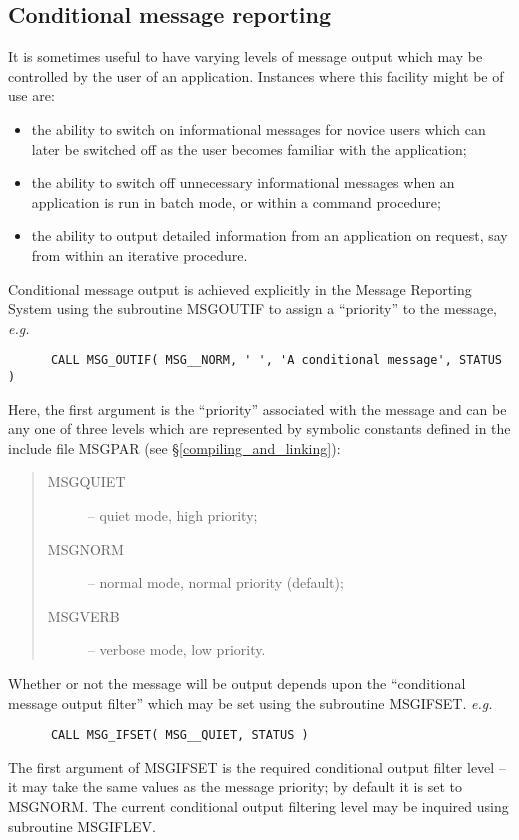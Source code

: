\documentclass[twoside,11pt]{article}
\newcommand{\htmlref}[2]{#1}
\newcommand{\latex}[1]{#1}
\newcommand{\xlabel}[1]{}
\renewcommand{\_}{\texttt{\symbol{95}}}
\begin{document}
\subsection{\xlabel{conditional_message_reporting}Conditional message reporting}
It is sometimes useful to have varying levels of message output which 
may be controlled by the user of an application.
Instances where this facility might be of use are:
\begin {itemize}
\item the ability to switch on informational messages for novice users
which can later be switched off as the user becomes familiar with 
the application;
\item the ability to switch off unnecessary informational messages when
an application is run in batch mode, or within a command procedure;
\item the ability to output detailed information from an application on 
request, say from within an iterative procedure.
\end {itemize}
Conditional message output is achieved explicitly in the Message Reporting
System using the subroutine MSG\_OUTIF to assign a ``priority'' to the
message, \textit{e.g.}
\begin {small}
\begin{verbatim}
      CALL MSG_OUTIF( MSG__NORM, ' ', 'A conditional message', STATUS )
\end{verbatim}
\end {small}
Here, the first argument is the ``priority'' associated with the 
message and can be any one of three levels which are 
represented by symbolic constants defined in the include file 
\htmlref
{MSG\_PAR}{compiling_and_linking}\latex{ (see \S\ref{compiling_and_linking})}:
\begin {quote}
\begin {description}
\item [MSG\_\_QUIET] -- quiet mode, high priority;
\item [MSG\_\_NORM] -- normal mode, normal priority (default);
\item [MSG\_\_VERB] -- verbose mode, low priority.
\end {description}
\end {quote}
Whether or not the message will be output depends upon the ``conditional
message output filter'' which may be set using the subroutine MSG\_IFSET.
\textit{e.g.}
\begin {small}
\begin{verbatim}
      CALL MSG_IFSET( MSG__QUIET, STATUS )
\end{verbatim}
\end {small}
The first argument of MSG\_IFSET is the required conditional output filter
level -- it may take the same values as the message priority; by default it
is set to MSG\_\_NORM.
The current conditional output filtering level may be inquired using
subroutine MSG\_IFLEV.
\end{document}

